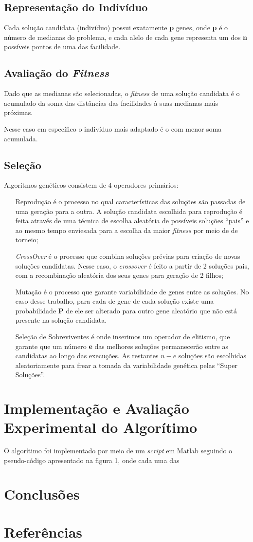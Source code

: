 \documentclass[]{article}
\begin{document}
\subsection{Representação do Indivíduo}
Cada solução candidata (indivíduo) possui exatamente \textbf{p} genes, onde \textbf{p} é o número de medianas do problema, e cada alelo de cada gene representa um dos \textbf{n} possíveis pontos de uma das facilidade. 

\subsection{Avaliação do \textit{Fitness}}
Dado que as medianas são selecionadas, o \textit{fitness} de uma solução candidata é o acumulado da soma das distâncias das facilidades à suas medianas mais próximas. 

Nesse caso em específico o indivíduo mais adaptado é o com menor soma acumulada.
\subsection{Seleção}
Algoritmos genéticos consistem de 4 operadores primários: 

\begin{itemize}
	\item [Reprodução] é o processo no qual características das soluções são passadas de uma geração para a outra. A solução candidata escolhida para reprodução é feita através de uma técnica de escolha aleatória de possíveis soluções ``pais'' e ao mesmo tempo enviesada para a escolha da maior \textit{fitness} por meio de de torneio;
	
	\item [\textit{CrossOver}] é o processo que combina soluções prévias para criação de novas soluções candidatas. Nesse caso, o \textit{crossover} é feito a partir de 2 soluções pais, com a recombinação aleatória dos seus genes para geração de 2 filhos;
	
	\item [Mutação] é o processo que garante variabilidade de genes entre as soluções. No caso desse trabalho, para cada de gene de cada solução existe uma probabilidade \textbf{P} de ele ser alterado para outro gene aleatório que não está presente na solução candidata.
	
	\item [Seleção de Sobreviventes] é onde inserimos um operador de elitismo, que garante que um número \textbf{e} das melhores soluções permanecerão entre as candidatas ao longo das execuções. As restantes \textbf{$n-e$} soluções são escolhidas aleatoriamente para frear a tomada da variabilidade genética pelas ``Super Soluções''.
\end{itemize}


\section{Implementação e Avaliação Experimental do Algorítimo}
O algorítimo foi implementado por meio de um \textit{script} em Matlab seguindo o pseudo-código apresentado na figura 1, onde cada uma das 
\section{Conclusões}

\section{Referências}
\end{document}
